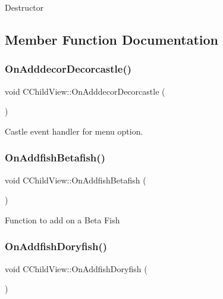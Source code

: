 Destructor 

\subsection{Member Function Documentation}
\mbox{\label{class_c_child_view_aaf8f6acf9df7bdfa17f9dfcfa60d7883}} 
\subsubsection{\texorpdfstring{On\+Adddecor\+Decorcastle()}{OnAdddecorDecorcastle()}}
{\footnotesize\ttfamily void C\+Child\+View\+::\+On\+Adddecor\+Decorcastle (\begin{DoxyParamCaption}{ }\end{DoxyParamCaption})}

Castle event handler for menu option. \mbox{\label{class_c_child_view_ad05faefbdb17d1c73f85de75b01a1ac1}} 
\subsubsection{\texorpdfstring{On\+Addfish\+Betafish()}{OnAddfishBetafish()}}
{\footnotesize\ttfamily void C\+Child\+View\+::\+On\+Addfish\+Betafish (\begin{DoxyParamCaption}{ }\end{DoxyParamCaption})}

Function to add on a Beta Fish \mbox{\label{class_c_child_view_acb27b77bb4d6f4997c7d2d94f1a4e14c}} 
\subsubsection{\texorpdfstring{On\+Addfish\+Doryfish()}{OnAddfishDoryfish()}}
{\footnotesize\ttfamily void C\+Child\+View\+::\+On\+Addfish\+Doryfish (\begin{DoxyParamCaption}{ }\end{DoxyParamCaption})}

